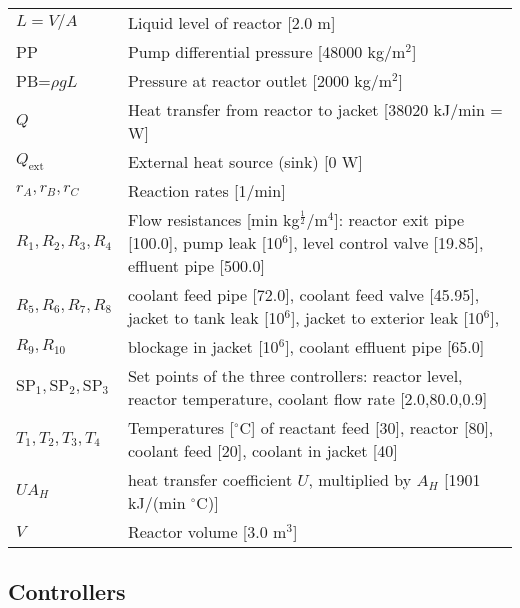 \documentclass[10pt, conference, compsocconf]{IEEEtran}
\newcommand{\celsius}{$^{\circ}$C}
\begin{document}
\begin{table}[ht]
\begin{center}
\begin{tabular}{p{2cm}p{5.8cm}}
$L=V/A$	&	Liquid level of reactor [2.0 m] \\
PP	&	Pump differential pressure [48000 kg/m$^{2}$] \\
PB=$\rho g L$	&	Pressure at reactor outlet [2000 kg/m$^{2}$] \\
$Q$	&	Heat transfer from reactor to jacket [38020 kJ/min = W] \\
$Q_{\text{ext}}$ & External heat source (sink) [0 W]	 \\
$r_{A},r_{B},r_{C}$	& Reaction rates	[1/min] \\
$R_{1},R_{2},R_{3},R_{4}$ & Flow resistances [min kg$^{\frac{1}{2}}$/m$^{4}$]: reactor exit pipe [100.0],
	pump leak [10$^{6}$], level control valve [19.85], effluent pipe [500.0] \\
$R_{5},R_{6},R_{7},R_{8}$ & coolant feed pipe [72.0], coolant feed valve [45.95],
	jacket to tank leak [10$^{6}$], jacket to exterior leak [10$^{6}$], \\
$R_{9},R_{10}$ & blockage in jacket [10$^{6}$], coolant effluent pipe [65.0] \\
$\text{SP}_{1},\text{SP}_{2},\text{SP}_{3}$ & Set points of the three controllers:
	reactor level, reactor temperature, coolant flow rate [2.0,80.0,0.9] \\
$T_{1},T_{2},T_{3},T_{4}$ & Temperatures [\celsius] of reactant feed [30], reactor [80],
	coolant feed [20], coolant in jacket [40] \\
$UA_{H}$	&heat transfer coefficient $U$, multiplied by $A_{H}$ [1901 kJ/(min \celsius)] \\
$V$		& Reactor volume [3.0 m$^{3}$] \\
\end{tabular}
\label{tab:modeleq}
\end{center}
\end{table}


\subsection{Controllers}\label{appendix:controllers}
\end{document}
